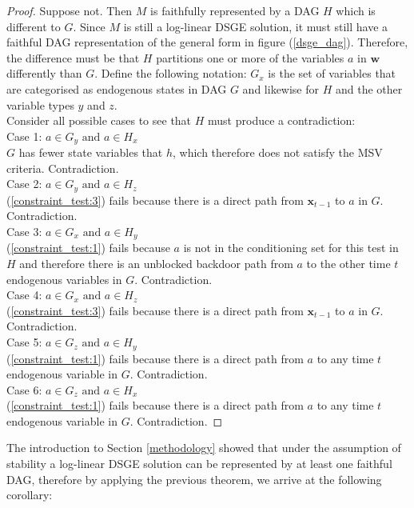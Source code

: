 \documentclass{article}
\begin{document}
\begin{proof}
  Suppose not. Then $M$ is faithfully represented by a DAG $H$ which is different to $G$. Since $M$ is still a log-linear DSGE solution, it must still have a faithful DAG representation of the general form in figure (\ref{dsge_dag}). Therefore, the difference must be that $H$ partitions one or more of the variables $a$ in $\mathbf{w}$ differently than $G$. Define the following notation: $G_x$ is the set of variables that are categorised as endogenous states in DAG  $G$ and likewise for $H$ and the other variable types $y$ and $z$. \\
  Consider all possible cases to see that $H$ must produce a contradiction: \\
  Case 1: $a \in G_y \text{ and } a \in H_x$ \\
    $G$ has fewer state variables that $h$, which therefore does not satisfy the MSV criteria. Contradiction. \\
  Case 2: $a \in G_y \text{ and } a \in H_z$ \\
    (\ref{constraint_test:3}) fails because there is a direct path from $\mathbf{x}_{t-1}$ to $a$ in $G$. Contradiction. \\
  Case 3: $a \in G_x \text{ and } a \in H_y$ \\
    (\ref{constraint_test:1}) fails because $a$ is not in the conditioning set for this test in $H$ and therefore there is an unblocked backdoor path from $a$ to the other time $t$ endogenous variables in $G$. Contradiction. \\
  Case 4: $a \in G_x \text{ and } a \in H_z$ \\
    (\ref{constraint_test:3}) fails because there is a direct path from $\mathbf{x}_{t-1}$ to $a$ in $G$. Contradiction. \\
  Case 5: $a \in G_z \text{ and } a \in H_y$ \\
    (\ref{constraint_test:1}) fails because there is a direct path from $a$ to any time $t$ endogenous variable in $G$. Contradiction. \\
  Case 6: $a \in G_z \text{ and } a \in H_x$ \\
    (\ref{constraint_test:1}) fails because there is a direct path from $a$ to any time $t$ endogenous variable in $G$. Contradiction. 
\end{proof}

The introduction to Section \ref{methodology} showed that under the assumption of stability a log-linear DSGE solution can be represented by at least one faithful DAG, therefore by applying the previous theorem, we arrive at the following corollary:
\end{document}
